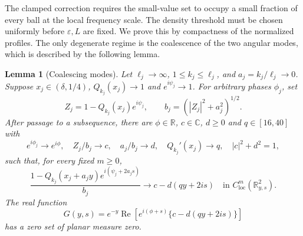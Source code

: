 \documentclass[11pt,twoside,leqno]{article}
\numberwithin{equation}{section}
\newtheorem{lemma}[theorem]{Lemma}
\theoremstyle{definition}
\theoremstyle{remark}
\newcommand{\R}{\mathbb R}
\newcommand{\C}{\mathbb C}
\newcommand{\loc}{\mathrm{loc}}
\newcommand{\eps}{\varepsilon}
\begin{document}
The clamped correction requires the small-value set to occupy a small
fraction of every ball at the local frequency scale. The density
threshold must be chosen uniformly before $\eps,L$ are fixed.
We prove this by compactness of the normalized profiles. The only
degenerate regime is the coalescence of the two angular modes,
which is described by the following lemma.

\begin{lemma}[Coalescing modes]\label{lem:coalescing}
Let $\ell_j\to\infty$, $1\le k_j\le\ell_j$, and
$a_j=k_j/\ell_j\to0$. Suppose
$x_j\in(\delta,1/4)$, $Q_{k_j}(x_j)\to1$ and $e^{i\psi_j}\to1$.
For arbitrary phases $\phi_j$, set
\[
 Z_j=1-Q_{k_j}(x_j)e^{i\psi_j},\qquad
 b_j=(|Z_j|^2+a_j^2)^{1/2}.
\]
After passage to a subsequence, there are $\phi\in\R$, $c\in\C$,
$d\ge0$ and $q\in[16,40]$ with
\[
 e^{i\phi_j}\to e^{i\phi},\quad Z_j/b_j\to c,\quad
 a_j/b_j\to d,\quad Q_{k_j}'(x_j)\to q,\quad |c|^2+d^2=1,
\]
such that, for every fixed $m\ge0$,
\begin{equation}\label{eq:coalescing}
 \frac{1-Q_{k_j}(x_j+a_jy)e^{i(\psi_j+2a_js)}}{b_j}
 \longrightarrow c-d(qy+2is)
 \quad\text{in }C^m_{\loc}(\R^2_{y,s}).
\end{equation}
The real function
\begin{equation}\label{eq:limit-profile}
 G(y,s)=e^{-y}\operatorname{Re}
       [e^{i(\phi+s)}\{c-d(qy+2is)\}]
\end{equation}
has a zero set of planar measure zero.
\end{lemma}
\end{document}
